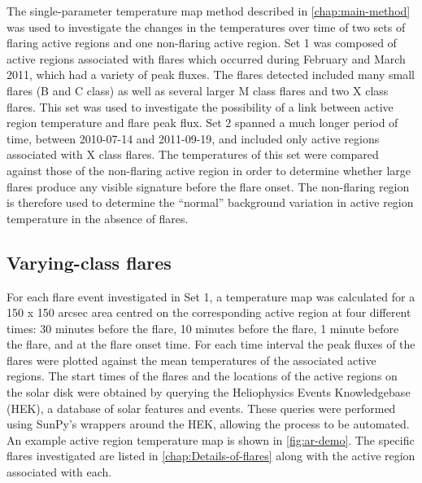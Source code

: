 \documentclass{article}
\begin{document}
The single-parameter temperature map method described in \ref{chap:main-method}
was used to investigate the changes in the temperatures over time
of two sets of flaring active regions and one non-flaring active region.
Set 1 was composed of active regions associated with flares which
occurred during February and March 2011, which had a variety of peak
fluxes. The flares detected included many small flares (B and C class)
as well as several larger M class flares and two X class flares. This
set was used to investigate the possibility of a link between active
region temperature and flare peak flux. Set 2 spanned a much longer
period of time, between 2010-07-14 and 2011-09-19, and included only
active regions associated with X class flares. The temperatures of
this set were compared against those of the non-flaring active region
in order to determine whether large flares produce any visible signature
before the flare onset. The non-flaring region is therefore used to
determine the ``normal'' background variation in active region temperature
in the absence of flares.


\subsection{Varying-class flares}
For each flare event investigated in Set 1, a temperature map was
calculated for a 150 x 150 arcsec area centred on the corresponding
active region at four different times: 30 minutes before the flare,
10 minutes before the flare, 1 minute before the flare, and at the
flare onset time. For each time interval the peak fluxes of the flares
were plotted against the mean temperatures of the associated active
regions. The start times of the flares and the locations of the active
regions on the solar disk were obtained by querying the Heliophysics
Events Knowledgebase (HEK), a database of solar features and events.
These queries were performed using SunPy's wrappers around the HEK,
allowing the process to be automated. An example active region temperature
map is shown in \ref{fig:ar-demo}. The specific flares investigated
are listed in \ref{chap:Details-of-flares} along with the active
region associated with each.
\end{document}
